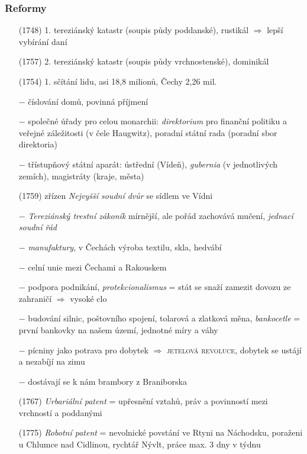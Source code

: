 \documentclass{article}
\begin{document}
\subsubsection*{Reformy}
\begin{itemize}
    \vspace{-0.5em}
    \setlength\itemsep{0.15em}
    \item[(1748)] 1. tereziánský katastr (soupis půdy poddanské), rustikál $\Rightarrow$ lepší vybírání daní
    \item[(1757)] 2. tereziánský katastr (soupis půdy vrchnostenské), dominikál
    \item[(1754)] 1. sčítání lidu, asi 18,8 milionů, Čechy 2,26 mil.
    \item[$-$] číslování domů, povinná příjmení
    \item[$-$] společné úřady pro celou monarchii: \textit{direktorium} pro finanční politiku a veřejné záležitosti (v čele Haugwitz), poradní státní rada (poradní sbor direktoria)
    \item[$-$] třístupňový státní aparát: ústřední (Vídeň), \textit{gubernia} (v jednotlivých zemích), magistráty (kraje, města)
    \item[(1759)] zřízen \textit{Nejvyšší soudní dvůr} se sídlem ve Vídni
    \item[$-$] \textit{Tereziánský trestní zákoník} mírnější, ale pořád zachovává mučení, \textit{jednací soudní řád}
    \item[$-$] \textit{manufaktury}, v Čechách výroba textilu, skla, hedvábí
    \item[$-$] celní unie mezi Čechami a Rakouskem
    \item[$-$] podpora podnikání, \textit{protekcionalismus} = stát se snaží zamezit dovozu ze zahraničí $\Rightarrow$ vysoké clo
    \item[$-$] budování silnic, poštovního spojení, tolarová a zlatková měna, \textit{bankocetle} = první bankovky na našem území, jednotné míry a váhy
    \item[$-$] pícniny jako potrava pro dobytek $\Rightarrow$ \textsc{jetelová revoluce}, dobytek se ustájí a nezabíjí na zimu
    \item[$-$] dostávají se k nám brambory z Braniborska
    \item[(1767)] \textit{Urbariální patent} = upřesnění vztahů, práv a povinností mezi vrchností a poddanými
    \item[(1775)] \textit{Robotní patent} = nevolnické povstání ve Rtyni na Náchodsku, poraženi u Chlumce nad Cidlinou, rychtář Nývlt, práce max. 3 dny v týdnu

\end{itemize}
\end{document}
